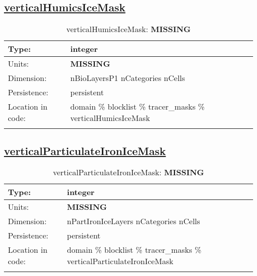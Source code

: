 \subsection[verticalHumicsIceMask]{\hyperref[sec:var_tab_tracer_masks]{verticalHumicsIceMask}}
\label{subsec:var_sec_tracer_masks_verticalHumicsIceMask}
\begin{center}
\begin{longtable}{| p{2.0in} | p{4.0in} |}
        \hline 
        Type: & integer \\
        \hline 
        Units: & {\bf \color{red} MISSING} \\
        \hline 
        Dimension: & nBioLayersP1 nCategories nCells \\
        \hline 
        Persistence: & persistent \\
        \hline 
         Location in code: & domain \% blocklist \% tracer\_masks \% verticalHumicsIceMask \\
         \hline 
    \caption{verticalHumicsIceMask: {\bf \color{red} MISSING}}
\end{longtable}
\end{center}
\subsection[verticalParticulateIronIceMask]{\hyperref[sec:var_tab_tracer_masks]{verticalParticulateIronIceMask}}
\label{subsec:var_sec_tracer_masks_verticalParticulateIronIceMask}
\begin{center}
\begin{longtable}{| p{2.0in} | p{4.0in} |}
        \hline 
        Type: & integer \\
        \hline 
        Units: & {\bf \color{red} MISSING} \\
        \hline 
        Dimension: & nPartIronIceLayers nCategories nCells \\
        \hline 
        Persistence: & persistent \\
        \hline 
         Location in code: & domain \% blocklist \% tracer\_masks \% verticalParticulateIronIceMask \\
         \hline 
    \caption{verticalParticulateIronIceMask: {\bf \color{red} MISSING}}
\end{longtable}
\end{center}
